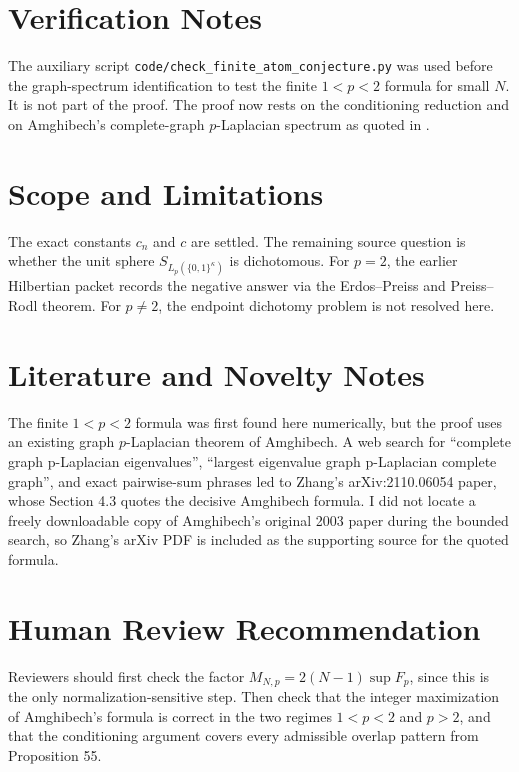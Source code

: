 \documentclass[11pt]{article}
\begin{document}
\section*{Verification Notes}

The auxiliary script \texttt{code/check\_finite\_atom\_conjecture.py} was used
before the graph-spectrum identification to test the finite \(1<p<2\) formula
for small \(N\).  It is not part of the proof.  The proof now rests on the
conditioning reduction and on Amghibech's complete-graph \(p\)-Laplacian
spectrum as quoted in \cite[Section 4.3]{Zhang2023}.

\section*{Scope and Limitations}

The exact constants \(c_n\) and \(c\) are settled.  The remaining source
question is whether the unit sphere \(S_{L_p(\{0,1\}^{\kappa})}\) is
dichotomous.  For \(p=2\), the earlier Hilbertian packet records the negative
answer via the Erdos--Preiss and Preiss--Rodl theorem.  For \(p\neq2\), the
endpoint dichotomy problem is not resolved here.

\section*{Literature and Novelty Notes}

The finite \(1<p<2\) formula was first found here numerically, but the proof
uses an existing graph \(p\)-Laplacian theorem of Amghibech.  A web search for
``complete graph p-Laplacian eigenvalues'', ``largest eigenvalue graph
p-Laplacian complete graph'', and exact pairwise-sum phrases led to Zhang's
arXiv:2110.06054 paper, whose Section 4.3 quotes the decisive Amghibech
formula.  I did not locate a freely downloadable copy of Amghibech's original
2003 paper during the bounded search, so Zhang's arXiv PDF is included as the
supporting source for the quoted formula.

\section*{Human Review Recommendation}

Reviewers should first check the factor \(M_{N,p}=2(N-1)\sup F_p\), since this
is the only normalization-sensitive step.  Then check that the integer
maximization of Amghibech's formula is correct in the two regimes \(1<p<2\)
and \(p>2\), and that the conditioning argument covers every admissible
overlap pattern from Proposition 55.
\end{document}
